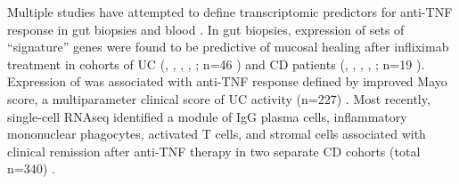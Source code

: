 Multiple studies have attempted to define transcriptomic predictors for anti-\gls{TNF} response in gut biopsies and blood \autocite{digby-bell2019InterrogatingHostImmunity,noor2020PersonalisedMedicineCrohn}.
In gut biopsies, expression of sets of \enquote{signature} genes were found to be predictive of mucosal healing after infliximab treatment in cohorts of 
\gls{UC} (, , , , ; n=46 \autocite{arijs2009MucosalGeneSignatures}) 
and \gls{CD} patients (, , , , ; n=19 \autocite{arijs2010PredictiveValueEpithelial}).
Expression of  was associated with anti-\gls{TNF} response defined by improved Mayo score, a multiparameter clinical score of \gls{UC} activity (n=227) \autocite{west2017OncostatinDrivesIntestinal}.
Most recently, single-cell \gls{RNAseq} identified a module of IgG plasma cells, inflammatory mononuclear phagocytes, activated T cells, and stromal cells associated with clinical remission after anti-\gls{TNF} therapy in two separate \gls{CD} cohorts (total n=340) \autocite{martin2019SingleCellAnalysisCrohn}.

